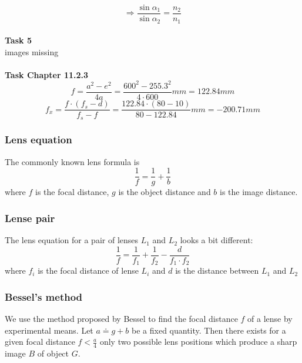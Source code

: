 \documentclass{scrreprt}
\begin{document}
\begin{equation}
\Rightarrow \frac{\sin \alpha_1}{\sin \alpha_2}=\frac{n_2}{n_1}
\end{equation}
\\ 
\textbf{Task 5}\\
images missing\\
\\
\textbf{Task Chapter 11.2.3}
\begin{equation}
f = \frac{a^2-e^2}{4a} = \frac{600^2-255.3^2}{4\cdot 600}mm = 122.84mm
\end{equation}
\begin{equation}
f_x = \frac{f \cdot (f_s-d)}{f_s-f} = \frac{122.84\cdot (80-10)}{80-122.84}mm = -200.71mm
\end{equation}

\subsubsection{Lens equation}
The commonly known lens formula is
\begin{equation}
\frac{1}{f} = \frac{1}{g} + \frac{1}{b}
\end{equation}
where $f$ is the focal distance, $g$ is the object distance and $b$ is the image distance.

\subsubsection{Lense pair}
The lens equation for a pair of lenses $L_1$ and $L_2$ looks a bit different:
\begin{equation}
\frac{1}{f}= \frac{1}{f_1} + \frac{1}{f_2} - \frac{d}{f_1 \cdot f_2}
\end{equation}
where $f_i$ is the focal distance of lense $L_i$ and $d$ is the distance between $L_1$ and $L_2$

\subsubsection{Bessel's method}
We use the method proposed by Bessel to find the focal distance $f$ of a lense by experimental means. Let $a \doteq g + b$ be a fixed quantity. Then there exists for a given focal distance $f < \frac{a}{4}$ only two possible lens positions which produce a sharp image $B$ of object $G$. 
\end{document}
